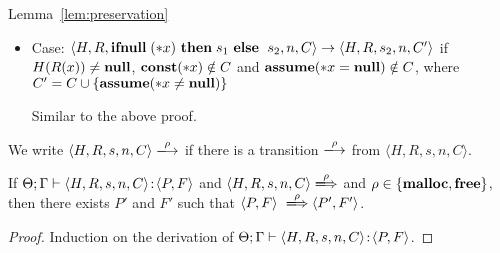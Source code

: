\begin{pfof}{Lemma~\ref{lem:preservation}}
\begin{itemize}

  
  \item Case: \(\langle H, R, \IFNULL \Sirx \ \THEN s_{1} \ \ELSE
  \ s_{2}, n, C\rangle \rightarrow \langle H, R, s_{2}, n, C'
  \rangle\) if \(H(R(x)) \neq \mathbf{null}\), \(\mathbf{const}(*x) \notin C\) and
  \(\mathbf{assume}(*x = \mathbf{null}) \notin C\), where \(C' = C \cup \{\mathbf{assume}(*x \ne \mathbf{null})\}\)

  Similar to the above proof.
  
\end{itemize}
\end{pfof}  


We write \(\langle H, R, s, n, C \rangle \xlongrightarrow{\rho}\) if
there is a transition \(\xlongrightarrow{\rho}\) from \(\langle H, R,
s, n, C \rangle\).

\begin{lemma}
\label{lem:enabled}
If \(\Theta; \Gamma \vdash \langle H, R, s, n, C \rangle \!:\! \langle
P,F \rangle\) and \(\langle H, R, s, n, C \rangle
\xLongrightarrow{\rho}\) and \(\rho \in \{\mathbf{malloc}, \mathbf{free}\}\), then
there exists \(P'\) and \(F'\) such that \( \langle P, F \rangle
\ \xLongrightarrow{\rho} \langle P', F'\rangle\).
\end{lemma}

\begin{proof}
Induction on the derivation of \(\Theta; \Gamma \vdash \langle H, R, s, n, C \rangle \!:\! \langle P, F \rangle\).
\end{proof}

